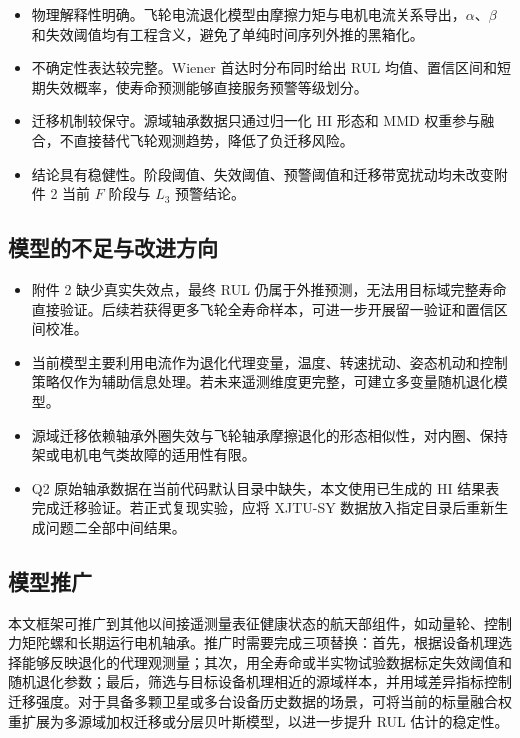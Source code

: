 \begin{itemize}
    \item 物理解释性明确。飞轮电流退化模型由摩擦力矩与电机电流关系导出，$\alpha$、$\beta$ 和失效阈值均有工程含义，避免了单纯时间序列外推的黑箱化。
    \item 不确定性表达较完整。Wiener 首达时分布同时给出 RUL 均值、置信区间和短期失效概率，使寿命预测能够直接服务预警等级划分。
    \item 迁移机制较保守。源域轴承数据只通过归一化 HI 形态和 MMD 权重参与融合，不直接替代飞轮观测趋势，降低了负迁移风险。
    \item 结论具有稳健性。阶段阈值、失效阈值、预警阈值和迁移带宽扰动均未改变附件 2 当前 $F$ 阶段与 $L_3$ 预警结论。
\end{itemize}

\subsection{模型的不足与改进方向}

\begin{itemize}
    \item 附件 2 缺少真实失效点，最终 RUL 仍属于外推预测，无法用目标域完整寿命直接验证。后续若获得更多飞轮全寿命样本，可进一步开展留一验证和置信区间校准。
    \item 当前模型主要利用电流作为退化代理变量，温度、转速扰动、姿态机动和控制策略仅作为辅助信息处理。若未来遥测维度更完整，可建立多变量随机退化模型。
    \item 源域迁移依赖轴承外圈失效与飞轮轴承摩擦退化的形态相似性，对内圈、保持架或电机电气类故障的适用性有限。
    \item Q2 原始轴承数据在当前代码默认目录中缺失，本文使用已生成的 HI 结果表完成迁移验证。若正式复现实验，应将 XJTU-SY 数据放入指定目录后重新生成问题二全部中间结果。
\end{itemize}

\subsection{模型推广}

本文框架可推广到其他以间接遥测量表征健康状态的航天部组件，如动量轮、控制力矩陀螺和长期运行电机轴承。推广时需要完成三项替换：首先，根据设备机理选择能够反映退化的代理观测量；其次，用全寿命或半实物试验数据标定失效阈值和随机退化参数；最后，筛选与目标设备机理相近的源域样本，并用域差异指标控制迁移强度。对于具备多颗卫星或多台设备历史数据的场景，可将当前的标量融合权重扩展为多源域加权迁移或分层贝叶斯模型，以进一步提升 RUL 估计的稳定性。
